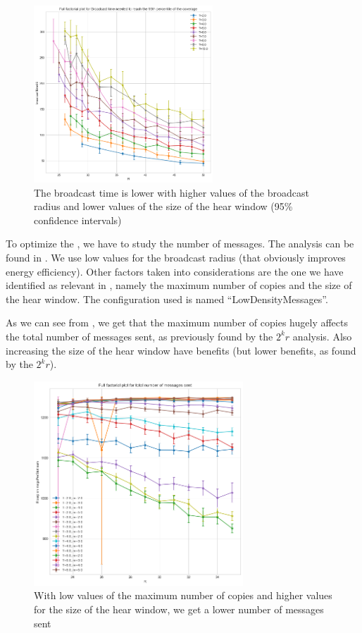 \begin{figure}[hbt]
	\centering
	\includegraphics[width=0.6\textwidth]{img/ld/broadcasttime-R-ffplot}
	\caption{The broadcast time is lower with higher values of the broadcast
	radius and lower values of the size of the hear
	window (95\% confidence intervals)}\label{fig:ldtimeff}
\end{figure}

To optimize the , we have to study the number of
messages. The analysis can be found in . We use low values
for the broadcast radius (that obviously improves energy efficiency). Other
factors taken into considerations are the one we have identified as relevant in
, namely the maximum number of copies and the size of the
hear window. The configuration used is named ``LowDensityMessages''.

As we can see from , we get that the maximum number of
copies hugely affects the total number of messages sent, as previously found by
the \(2^{k}r\) analysis. Also increasing the size of the hear window have
benefits (but lower benefits, as found by the \(2^{k}r\)).

\begin{figure}[htb]
	\centering
	\includegraphics[width=0.7\textwidth]{img/ld/messages-R-ffplot.png}
	\caption{With low values of the maximum number of copies and higher
	values for the size of the hear window, we get a lower number of
	messages sent}\label{fig:ldmessagesff}
\end{figure}

